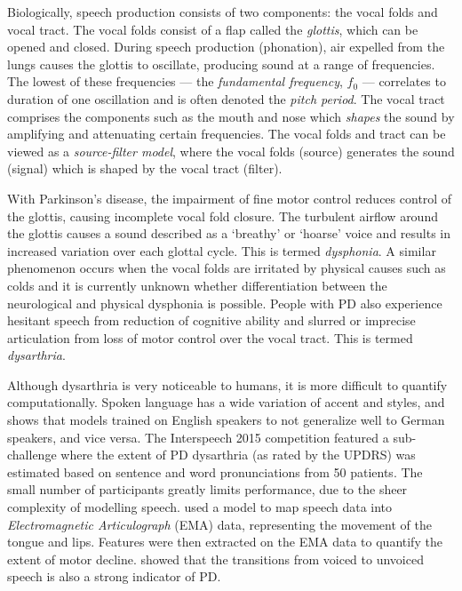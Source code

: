 \documentclass{article}
\begin{document}
Biologically, speech production consists of two components: the vocal folds and vocal tract. The vocal folds consist of a flap called the \emph{glottis}, which can be opened and closed. During speech production (phonation), air expelled from the lungs causes the glottis to oscillate, producing sound at a range of frequencies. The lowest of these frequencies --- the \textit{fundamental frequency}, \emph{$f_0$} --- correlates to duration of one oscillation and is often denoted the \textit{pitch period}. The vocal tract comprises the components such as the mouth and nose which \textit{shapes} the sound by amplifying and attenuating certain frequencies. The vocal folds and tract can be viewed as a \emph{source-filter model}, where the vocal folds (source) generates the sound (signal) which is shaped by the vocal tract (filter). 

With Parkinson's disease, the impairment of fine motor control reduces control of the glottis, causing incomplete vocal fold closure. The turbulent airflow around the glottis causes a sound described as a `breathy' or `hoarse' voice and results in increased variation over each glottal cycle. This is termed \emph{dysphonia}. A similar phenomenon occurs when the vocal folds are irritated by physical causes such as colds and it is currently unknown whether differentiation between the neurological and physical dysphonia is possible. People with PD also experience hesitant speech from reduction of cognitive ability and slurred or imprecise articulation from 
loss of motor control over the vocal tract. This is termed \emph{dysarthria}.


Although dysarthria is very noticeable to humans, it is more difficult to quantify computationally. Spoken language has a wide variation of accent and styles, and \citealt{hazan2012} shows that models trained on English speakers to not generalize well to German speakers, and vice versa. The Interspeech 2015 competition \cite{compareis15pd} featured a sub-challenge where the extent of PD dysarthria (as rated by the UPDRS) was estimated based on sentence and word pronunciations from 50 patients. The small number of participants greatly limits performance, due to the sheer complexity of modelling speech. \citealt{hahm2015parkinson} used a model to map speech data into \textit{Electromagnetic Articulograph} (EMA) data, representing the movement of the tongue and lips. Features were then extracted on the EMA data to quantify the extent of motor decline. \citealt{orozco2015voiced} showed that the transitions from voiced to unvoiced speech is also a strong indicator of PD.
\end{document}
